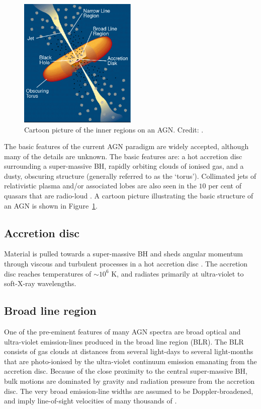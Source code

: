 \begin{figure}
  \centering
  \includegraphics[width=0.5\textwidth]{figures/chapter05/urry_model}
  \caption[{Cartoon picture of the inner regions on an AGN.}]{Cartoon picture of the inner regions on an AGN. Credit: \citet{urry95}.}
  \label{fig:agnmodel}
\end{figure}

The basic features of the current AGN paradigm are widely accepted, although many of the details are unknown. 
The basic features are: a hot accretion disc surrounding a super-massive BH, rapidly orbiting clouds of ionised gas, and a dusty, obscuring structure (generally referred to as the `torus'). 
Collimated jets of relativistic plasma and/or associated lobes are also seen in the $10$ per cent of quasars that are radio-loud \citep[e.g.][]{peterson97}. 
A cartoon picture illustrating the basic structure of an AGN is shown in Figure~\ref{fig:agnmodel}. 

\subsection{Accretion disc}

Material is pulled towards a super-massive BH and sheds angular momentum through viscous and turbulent processes in a hot accretion disc \citep[e.g.][]{begelman85}. 
The accretion disc reaches temperatures of $\sim10^6$ K, and radiates primarily at ultra-violet to soft-X-ray wavelengths. 

\subsection{Broad line region}

One of the pre-eminent features of many AGN spectra are broad optical and ultra-violet emission-lines produced in the broad line region (BLR). 
The BLR consists of gas clouds at distances from several light-days to several light-months that are photo-ionised by the ultra-violet continuum emission emanating from the accretion disc.  
Because of the close proximity to the central super-massive BH, bulk motions are dominated by gravity and radiation pressure from the accretion disc.
The very broad emission-line widths are assumed to be Doppler-broadened, and imply line-of-sight velocities of many thousands of \kms. 

